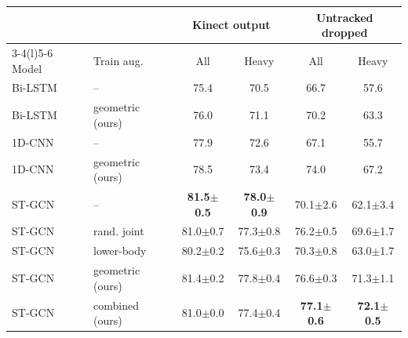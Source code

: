 \begin{tabular}{@{}llcccc@{}}
\toprule
 & & \multicolumn{2}{c}{Kinect output} & \multicolumn{2}{c}{Untracked dropped} \\
\cmidrule(lr){3-4}\cmidrule(l){5-6}
Model & Train aug. & All & Heavy & All & Heavy \\
\midrule
Bi-LSTM & -- & 75.4 & 70.5 & 66.7 & 57.6 \\
Bi-LSTM & geometric (ours) & 76.0 & 71.1 & 70.2 & 63.3 \\
1D-CNN & -- & 77.9 & 72.6 & 67.1 & 55.7 \\
1D-CNN & geometric (ours) & 78.5 & 73.4 & 74.0 & 67.2 \\
ST-GCN & -- & \textbf{81.5$\pm$0.5} & \textbf{78.0$\pm$0.9} & 70.1$\pm$2.6 & 62.1$\pm$3.4 \\
ST-GCN & rand. joint & 81.0$\pm$0.7 & 77.3$\pm$0.8 & 76.2$\pm$0.5 & 69.6$\pm$1.7 \\
ST-GCN & lower-body & 80.2$\pm$0.2 & 75.6$\pm$0.3 & 70.3$\pm$0.8 & 63.0$\pm$1.7 \\
ST-GCN & geometric (ours) & 81.4$\pm$0.2 & 77.8$\pm$0.4 & 76.6$\pm$0.3 & 71.3$\pm$1.1 \\
ST-GCN & combined (ours) & 81.0$\pm$0.0 & 77.4$\pm$0.4 & \textbf{77.1$\pm$0.6} & \textbf{72.1$\pm$0.5} \\
\bottomrule
\end{tabular}
